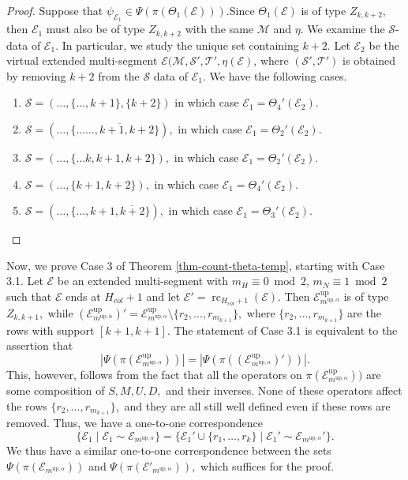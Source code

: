 \documentclass[11pt,letterpaper]{amsart}
\newcommand{\up}{{\mathrm{up}}}
\newcommand{\sm}{\setminus}
\newcommand{\EE}{\mathcal{E}}
\newcommand{\rc}{\operatorname{rc}}
\numberwithin{equation}{section}
\begin{document}
\begin{proof}
    Suppose that  {$\psi_{\mathcal{E}_1} \in \Psi(\pi(\Theta_1(\mathcal{E})))$.}Since $\Theta_1(\mathcal{E})$ is of type $Z_{k, k + 2},$ then $\mathcal{E}_1$ must also be of type $Z_{k, k + 2}$ with the same $\mathcal{M}$ and $\eta.$ We examine the $\mathcal{S}$-data of $\mathcal{E}_1$. In particular, we study the unique set containing $k + 2.$ Let $\mathcal{E}_2$ be the virtual extended multi-segment $\mathcal{E}(\mathcal{M}, \mathcal{S}', \mathcal{T}', \eta(\mathcal{E})$, where $(\mathcal{S}', \mathcal{T}')$ is obtained by removing $k + 2$ from the $\mathcal{S}$ data of $\mathcal{E}_1$. We have the following cases.

    \begin{enumerate}
        \item $\mathcal{S} = (\dots, \{\dots, k + 1\}, \{k + 2\})$ in which case $\mathcal{E}_1 = \Theta_4'(\mathcal{E}_2).$
        \item $\mathcal{S} = (\dots, \{ \dots \overline{\dots, k + 1, k + 2}\}),$ in which case $\mathcal{E}_1= \Theta_2'(\mathcal{E}_2).$
        \item $\mathcal{S} = (\dots, \{ \dots k, k + 1, k + 2\}),$ in which case $\mathcal{E}_1= \Theta_2'(\mathcal{E}_2).$
        \item $\mathcal{S} = (\dots, \{k + 1, k + 2\}),$ in which case $\mathcal{E}_1 = \Theta_4'(\mathcal{E}_2).$
        \item $\mathcal{S} = (\dots, \{\dots, k + 1, \overline{k + 2}\}),$ in which case $\mathcal{E}_1 = \Theta_3'(\mathcal{E}_2).$ \qedhere
    \end{enumerate}
\end{proof}

Now, we prove Case 3 of Theorem \ref{thm-count-theta-temp}, starting with Case 3.1. Let $\mathcal{E}$ be an extended multi-segment with $m_H \equiv 0 \bmod{2}$, $m_N \equiv 1 \bmod{2}$ such that $\EE$ ends at $H_{col}+1$ and let $\EE' = \rc_{H_{col}+1}(\EE).$ Then $\mathcal{E}_{m^{\up, \alpha}}^\up$ is of type $Z_{k, k + 1},$ while $(\mathcal{E}_{m^{\up, \alpha}}^\up)' = \mathcal{E}_{m^{\up, \alpha}}^\up \sm \{r_2, \dots, r_{m_{k + 1}}\},$ where $\{r_2, \dots, r_{m_{k + 1}} \}$ are the rows with support $[k + 1, k + 1]$. The statement of Case 3.1 is equivalent to the assertion that 
$$|\Psi(\pi(\mathcal{E}_{m^{\up, \alpha}}^\up))| = |\Psi(\pi((\mathcal{E}_{m^{\up, \alpha}}^\up)'))|.$$
This, however, follows from the fact that all the operators on $\pi(\mathcal{E}_{m^{\up, \alpha}}^\up))$ are some composition of $S, M, U, D,$ and their inverses. None of these operators affect the rows $\{r_2, \dots, r_{m_{k + 1}}\},$ and they are all still well defined even if these rows are removed. Thus, we have a one-to-one correspondence
$$\{\mathcal{E}_1 \mid \mathcal{E}_1 \sim \mathcal{E}_{m^{\up, \alpha}}\} = \{\mathcal{E}_1' \cup \{r_1, \dots, r_k\} \mid \mathcal{E}_1' \sim \mathcal{E}_{m^{\up, \alpha}}'\}.$$
We thus have a similar one-to-one correspondence between the sets $\Psi(\pi(\mathcal{E}_{m^{\up, \alpha}}))$ and $\Psi(\pi(\mathcal{E}'_{m^{\up, \alpha}})),$ which suffices for the proof.
\end{document}
